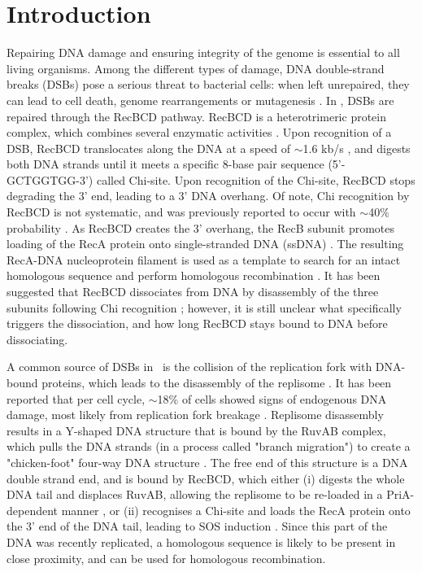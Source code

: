 \section*{Introduction}
Repairing DNA damage and ensuring integrity of the genome is essential to all living organisms. Among the different types of damage, DNA double-strand breaks (DSBs) pose a serious threat to bacterial cells: when left unrepaired, they can lead to cell death, genome rearrangements or mutagenesis \cite{Wyman2006}. In \ecoli, DSBs are repaired through the RecBCD pathway. RecBCD is a heterotrimeric protein complex, which combines several enzymatic activities \cite{Dillingham2008}. Upon recognition of a DSB, RecBCD translocates along the DNA at a speed of $\sim$1.6 kb/s \cite{Wiktor2018}, and digests both DNA strands until it meets a specific 8-base pair sequence (5'-GCTGGTGG-3') called Chi-site. Upon recognition of the Chi-site, RecBCD stops degrading the 3' end, leading to a 3' DNA overhang. Of note, Chi recognition by RecBCD is not systematic, and was previously reported to occur with $\sim$40\% probability \cite{Taylor1992,Cockram2015}. As RecBCD creates the 3' overhang, the RecB subunit promotes loading of the RecA protein onto single-stranded DNA (ssDNA) \cite{Churchill2000, Spies2006}. The resulting RecA-DNA nucleoprotein filament is used as a template to search for an intact homologous sequence and perform homologous recombination \cite{Wyman2004,Wiktor2021}. It has been suggested that RecBCD dissociates from DNA by disassembly of the three subunits following Chi recognition \cite{Taylor1999}; however, it is still unclear what specifically triggers the dissociation, and how long RecBCD stays bound to DNA before dissociating.

A common source of DSBs in \ecoli\ is the collision of the replication fork with DNA-bound proteins, which leads to the disassembly of the replisome \cite{Michel1997}. It has been reported that per cell cycle, $\sim$18\% of cells showed signs of endogenous DNA damage, most likely from replication fork breakage \cite{Sinha2018}. Replisome disassembly results in a Y-shaped DNA structure that is bound by the RuvAB complex, which pulls the DNA strands (in a process called "branch migration") to create a "chicken-foot" four-way DNA structure \cite{Seigneur1998}. The free end of this structure is a DNA double strand end, and is bound by RecBCD, which either (i) digests the whole DNA tail and displaces RuvAB, allowing the replisome to be re-loaded in a PriA-dependent manner \cite{Seigneur1998}, or (ii) recognises a Chi-site and loads the RecA protein onto the 3' end of the DNA tail, leading to SOS induction \cite{Michel2001}. Since this part of the DNA was recently replicated, a homologous sequence is likely to be present in close proximity, and can be used for homologous recombination.

